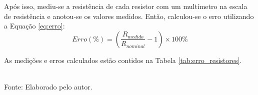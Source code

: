 \documentclass[12pt]{article}
\begin{document}
Após isso, mediu-se a resistência de cada resistor com um multímetro na escala de resistência e anotou-se os valores medidos. Então, calculou-se o erro utilizando a Equação \ref{eq:erro}:
\begin{equation}
    Erro(\%) = \left(\frac{R_{medido}}{R_{nominal}} -1\right)\times 100\%
    \label{eq:erro}
\end{equation}

As medições e erros calculados estão contidos na Tabela \ref{tab:erro_resistores}.
\begin{table}[H]
    \caption{Valores e nominais e erro de medição dos resistores.}
    \label{tab:erro_resistores}
    \centering
    \\
    \footnotesize{Fonte: Elaborado pelo autor.}
\end{table}
\end{document}
